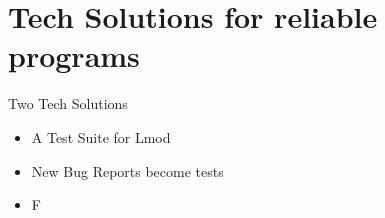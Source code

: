 \documentclass{beamer}
\begin{document}
\section{Tech Solutions for reliable programs}

\begin{frame}{Two Tech Solutions}
  \begin{itemize}
    \item A Test Suite for Lmod
    \item New Bug Reports become tests
    \item F
  \end{itemize}
\end{frame}
\end{document}
